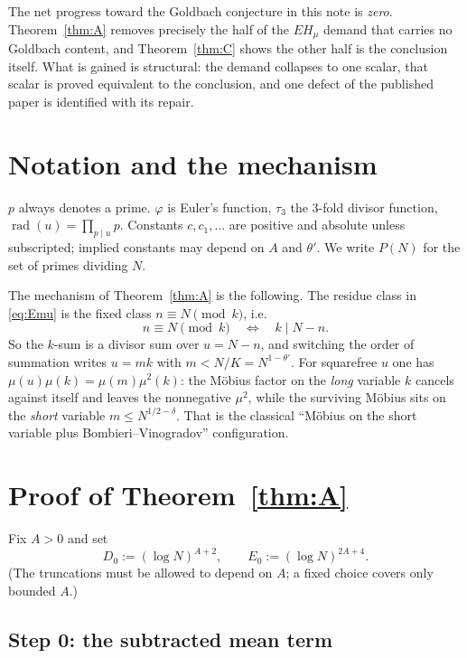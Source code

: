 \documentclass[11pt,a4paper]{article}
\theoremstyle{plain}
\theoremstyle{definition}
\DeclareMathOperator{\rad}{rad}
\begin{document}
The net progress toward the Goldbach conjecture in this note is
\emph{zero}. Theorem~\ref{thm:A} removes precisely the half of the
$EH_\mu$ demand that carries no Goldbach content, and
Theorem~\ref{thm:C} shows the other half is the conclusion itself. What
is gained is structural: the demand collapses to one scalar, that
scalar is proved equivalent to the conclusion, and one defect of the
published paper is identified with its repair.

\section{Notation and the mechanism}\label{sec:mechanism}

$p$ always denotes a prime. $\varphi$ is Euler's function, $\tau_3$ the
$3$-fold divisor function, $\rad(u)=\prod_{p\mid u}p$. Constants
$c,c_1,\dots$ are positive and absolute unless subscripted;
implied constants may depend on $A$ and $\theta'$. We write
$P(N)$ for the set of primes dividing $N$.

The mechanism of Theorem~\ref{thm:A} is the following. The residue class
in \eqref{eq:Emu} is the fixed class $n\equiv N\pmod k$, i.e.
\[
  n \equiv N \pmod{k}\quad\Longleftrightarrow\quad k \mid N-n .
\]
So the $k$-sum is a divisor sum over $u=N-n$, and switching the order of
summation writes $u=mk$ with $m<N/K=N^{1-\theta'}$. For squarefree $u$
one has $\mu(u)\mu(k)=\mu(m)\mu^2(k)$: the M\"obius factor on the
\emph{long} variable $k$ cancels against itself and leaves the
nonnegative $\mu^2$, while the surviving M\"obius sits on the
\emph{short} variable $m\le N^{1/2-\delta}$. That is the classical
``M\"obius on the short variable plus Bombieri--Vinogradov''
configuration.

\section{Proof of Theorem~\ref{thm:A}}

Fix $A>0$ and set
\begin{equation}\label{eq:trunc}
  D_0 := (\log N)^{A+2}, \qquad E_0 := (\log N)^{2A+4} .
\end{equation}
(The truncations must be allowed to depend on $A$; a fixed choice covers
only bounded $A$.)

\subsection{Step 0: the subtracted mean term}
\end{document}
